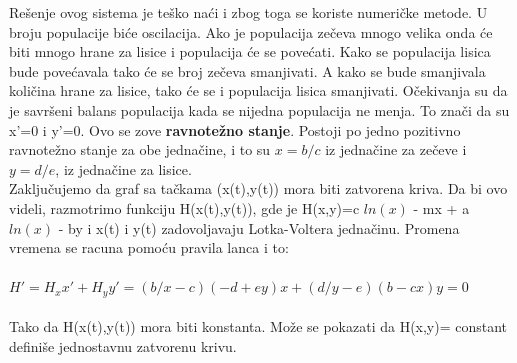 \documentclass[a4paper]{article}
\begin{document}
Rešenje ovog sistema je teško naći i zbog toga se koriste numeričke metode. U broju populacije biće oscilacija.
Ako je populacija zečeva mnogo velika onda će biti mnogo hrane za lisice i populacija će se povećati.
Kako se populacija lisica bude povećavala tako će se broj zečeva smanjivati. A kako se bude smanjivala
količina hrane za lisice, tako će se i populacija lisica smanjivati. Očekivanja su da je savršeni balans populacija
kada se nijedna populacija ne menja. To znači da su  x'=0 i y'=0. Ovo se zove  \textbf{ravnotežno stanje}.
Postoji po jedno pozitivno ravnotežno stanje za obe jednačine, i to su $x=b/c$ iz jednačine za zečeve i $y=d/e$, iz jednačine za lisice.\\ 
Zaključujemo da  graf sa tačkama (x(t),y(t)) mora biti zatvorena kriva.
Da bi ovo videli, razmotrimo funkciju H(x(t),y(t)), gde
je H(x,y)=c $ln(x)$ - mx + a $ln(x)$ - by i x(t) i y(t) zadovoljavaju Lotka-Voltera jednačinu.
Promena vremena se racuna pomoću pravila lanca i to: \\ \\ $H'=H_x x' + H_y y' = (b/x - c)(-d + ey)x + (d/y - e)(b - cx)y = 0$ \\ \\
Tako da  H(x(t),y(t)) mora biti konstanta. Može se pokazati da H(x,y)= constant definiše jednostavnu zatvorenu krivu.
\end{document}

